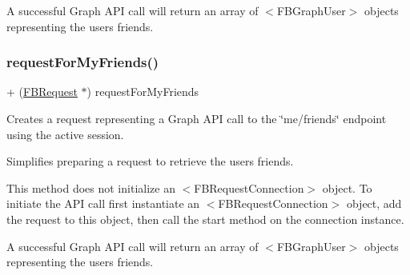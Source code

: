 A successful Graph A\+PI call will return an array of $<$\+F\+B\+Graph\+User$>$ objects representing the user\textquotesingle{}s friends. \mbox{\label{interfaceFBRequest_a95570ea8628f71b3c311da8378729cc6}} 
\subsubsection{\texorpdfstring{request\+For\+My\+Friends()}{requestForMyFriends()}\hspace{0.1cm}{\footnotesize\ttfamily [5/5]}}
{\footnotesize\ttfamily + (\hyperlink{interfaceFBRequest}{F\+B\+Request} $\ast$) request\+For\+My\+Friends \begin{DoxyParamCaption}{ }\end{DoxyParamCaption}}

Creates a request representing a Graph A\+PI call to the \char`\"{}me/friends\char`\"{} endpoint using the active session.

Simplifies preparing a request to retrieve the user\textquotesingle{}s friends.

This method does not initialize an $<$\+F\+B\+Request\+Connection$>$ object. To initiate the A\+PI call first instantiate an $<$\+F\+B\+Request\+Connection$>$ object, add the request to this object, then call the {\ttfamily start} method on the connection instance.

A successful Graph A\+PI call will return an array of $<$\+F\+B\+Graph\+User$>$ objects representing the user\textquotesingle{}s friends. \mbox{\label{interfaceFBRequest_a1965c2185e0d9c98e19d0edd20180ab8}} 
